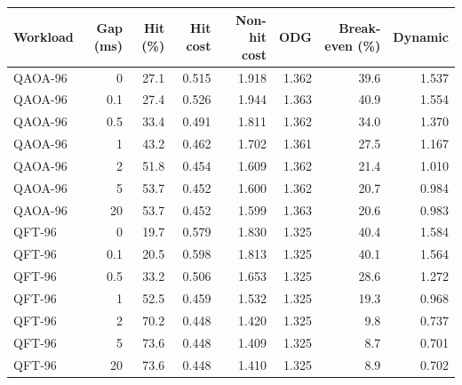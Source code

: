 \begin{tabular}{lrrrrrrr}
\toprule
Workload & Gap (ms) & Hit (\%) & Hit cost & Non-hit cost & ODG & Break-even (\%) & Dynamic \\
\midrule
QAOA-96 & 0 & 27.1 & 0.515 & 1.918 & 1.362 & 39.6 & 1.537 \\
QAOA-96 & 0.1 & 27.4 & 0.526 & 1.944 & 1.363 & 40.9 & 1.554 \\
QAOA-96 & 0.5 & 33.4 & 0.491 & 1.811 & 1.362 & 34.0 & 1.370 \\
QAOA-96 & 1 & 43.2 & 0.462 & 1.702 & 1.361 & 27.5 & 1.167 \\
QAOA-96 & 2 & 51.8 & 0.454 & 1.609 & 1.362 & 21.4 & 1.010 \\
QAOA-96 & 5 & 53.7 & 0.452 & 1.600 & 1.362 & 20.7 & 0.984 \\
QAOA-96 & 20 & 53.7 & 0.452 & 1.599 & 1.363 & 20.6 & 0.983 \\
QFT-96 & 0 & 19.7 & 0.579 & 1.830 & 1.325 & 40.4 & 1.584 \\
QFT-96 & 0.1 & 20.5 & 0.598 & 1.813 & 1.325 & 40.1 & 1.564 \\
QFT-96 & 0.5 & 33.2 & 0.506 & 1.653 & 1.325 & 28.6 & 1.272 \\
QFT-96 & 1 & 52.5 & 0.459 & 1.532 & 1.325 & 19.3 & 0.968 \\
QFT-96 & 2 & 70.2 & 0.448 & 1.420 & 1.325 & 9.8 & 0.737 \\
QFT-96 & 5 & 73.6 & 0.448 & 1.409 & 1.325 & 8.7 & 0.701 \\
QFT-96 & 20 & 73.6 & 0.448 & 1.410 & 1.325 & 8.9 & 0.702 \\
\bottomrule
\end{tabular}
